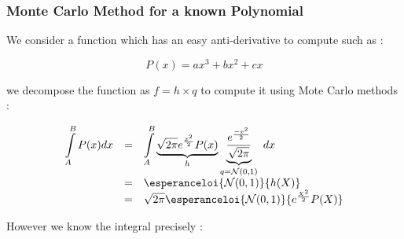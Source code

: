 
\subsubsection{Monte Carlo Method for a known Polynomial}


We consider a function which has an easy anti-derivative to compute such as :


$$P(x) = ax^3 + b x^2 + c x$$

we decompose the function as $f = h \times q $ to compute it using Mote Carlo methods :

$$\begin{array}{rcl}
\displaystyle\int\limits_A^B P(x)dx 
&=& 
\displaystyle\int\limits_A^B \underbrace{\sqrt{2\pi} e^{\frac{x^2} 2}P(x)}_{h} \underbrace{\frac{e^{\frac{-x^2} 2}}{\sqrt{2\pi}}}_{q = \mathcal N(0,1)} \ dx
\\
&=& \esperanceloi{\mathcal N(0,1)}{h(X)} 
\\
&=& \sqrt{2\pi} \esperanceloi{\mathcal N(0,1)} {e^{\frac{X^2} 2}P(X)}
\end{array}$$

However we know the integral precisely :


